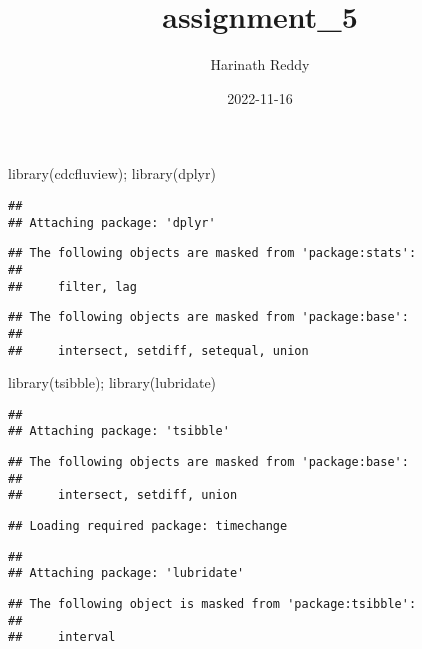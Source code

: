 \documentclass[
]{article}
\title{assignment\_5}
\author{Harinath Reddy}
\date{2022-11-16}
\newenvironment{Shaded}{\begin{snugshade}}{\end{snugshade}}
\newcommand{\FunctionTok}[1]{\textcolor[rgb]{0.00,0.00,0.00}{#1}}
\newcommand{\NormalTok}[1]{#1}
\begin{document}
\maketitle

\begin{Shaded}
\begin{Highlighting}[]
\FunctionTok{library}\NormalTok{(cdcfluview); }\FunctionTok{library}\NormalTok{(dplyr)}
\end{Highlighting}
\end{Shaded}

\begin{verbatim}
## 
## Attaching package: 'dplyr'
\end{verbatim}

\begin{verbatim}
## The following objects are masked from 'package:stats':
## 
##     filter, lag
\end{verbatim}

\begin{verbatim}
## The following objects are masked from 'package:base':
## 
##     intersect, setdiff, setequal, union
\end{verbatim}

\begin{Shaded}
\begin{Highlighting}[]
\FunctionTok{library}\NormalTok{(tsibble); }\FunctionTok{library}\NormalTok{(lubridate)}
\end{Highlighting}
\end{Shaded}

\begin{verbatim}
## 
## Attaching package: 'tsibble'
\end{verbatim}

\begin{verbatim}
## The following objects are masked from 'package:base':
## 
##     intersect, setdiff, union
\end{verbatim}

\begin{verbatim}
## Loading required package: timechange
\end{verbatim}

\begin{verbatim}
## 
## Attaching package: 'lubridate'
\end{verbatim}

\begin{verbatim}
## The following object is masked from 'package:tsibble':
## 
##     interval
\end{verbatim}
\end{document}

